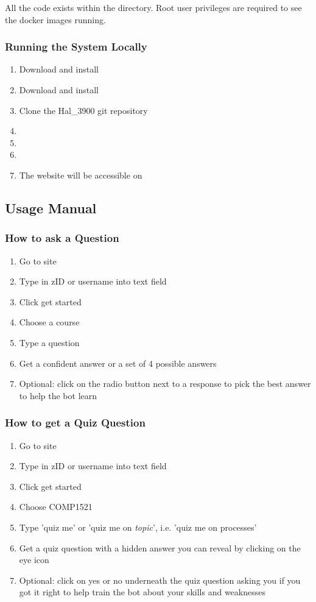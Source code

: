 All the code exists within the  directory. Root user privileges are required to see the docker images running.

\subsubsection{Running the System Locally}
\begin{enumerate}
    \item{Download and install }
    \item{Download and install }
	\item{Clone the Hal\_3900 git repository}
	\item{}
	\item{}
	\item{}
    \item{The website will be accessible on }
\end{enumerate}

\subsection{Usage Manual}
\subsubsection{How to ask a Question}
\begin{enumerate}
	\item{Go to site}
	\item{Type in zID or username into text field}
	\item{Click get started}
	\item{Choose a course}
	\item{Type a question}
	\item{Get a confident answer or a set of 4 possible answers}
	\item{Optional: click on the radio button next to a response to pick the best answer to help the bot learn}
\end{enumerate}

\subsubsection{How to get a Quiz Question}
\begin{enumerate}
	\item{Go to site}
	\item{Type in zID or username into text field}
	\item{Click get started}
	\item{Choose COMP1521}
    \item{Type 'quiz me' or 'quiz me on \textit{topic}', i.e. 'quiz me on processes'}
	\item{Get a quiz question with a hidden answer you can reveal by clicking on the eye icon}
    \item{Optional: click on yes or no underneath the quiz question asking you if you got it right to help train the bot about your skills and weaknesses}
\end{enumerate}

